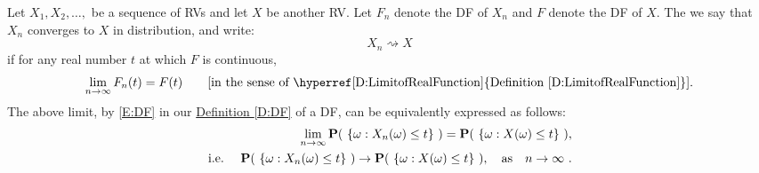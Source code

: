 \begin{definition}\label{D:ConvInDist}
Let $X_1,X_2,\ldots,$ be a sequence of RVs and let $X$ be another RV.  Let $F_n$ denote the DF of $X_n$ and $F$ denote the DF of $X$.  The we say that $X_n$ converges to $X$ in distribution, and write:
\[
X_n \rightsquigarrow X
\]
if for any real number $t$ at which $F$ is continuous,
\[
\lim_{n \rightarrow \infty} F_n(t) = F(t) \qquad \text{[in the sense of \hyperref[D:LimitofRealFunction]{Definition \ref*{D:LimitofRealFunction}}].}
\]
The above limit, by \eqref{E:DF} in our \hyperref[D:DF]{Definition \ref*{D:DF}} of a DF, can be equivalently expressed as follows: 
\begin{eqnarray}
& & \lim_{n \rightarrow \infty} \mathbf{P}( \ \{\omega: X_n(\omega) \leq  t \} \ )= 
\mathbf{P}( \ \{\omega: X(\omega) \leq  t \} \ ), \notag \\
&\text{i.e.~} & \mathbf{P}( \ \{\omega: X_n(\omega) \leq t \} \ ) \rightarrow \mathbf{P}( \ \{\omega: X(\omega) \leq  t \} \ ), \quad \text{as} \quad n \rightarrow \infty \notag \ .
\end{eqnarray}
\end{definition}

